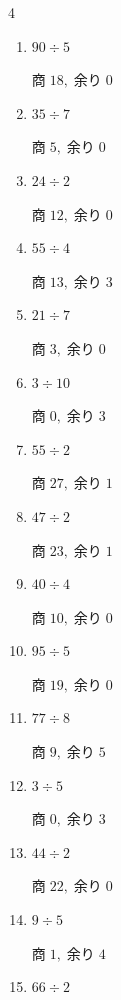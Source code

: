 \begin{multicols}{4}
\begin{enumerate}
        $商\; 19,\; 余り\; 1$

  \item $90 \div 5$

        $商\; 18,\; 余り\; 0$

  \item $35 \div 7$

        $商\; 5,\; 余り\; 0$

  \item $24 \div 2$

        $商\; 12,\; 余り\; 0$

  \item $55 \div 4$

        $商\; 13,\; 余り\; 3$

  \item $21 \div 7$

        $商\; 3,\; 余り\; 0$

  \item $3 \div 10$

        $商\; 0,\; 余り\; 3$

\columnbreak %

  \item $55 \div 2$

        $商\; 27,\; 余り\; 1$

  \item $47 \div 2$

        $商\; 23,\; 余り\; 1$

  \item $40 \div 4$

        $商\; 10,\; 余り\; 0$

  \item $95 \div 5$

        $商\; 19,\; 余り\; 0$

  \item $77 \div 8$

        $商\; 9,\; 余り\; 5$

  \item $3 \div 5$

        $商\; 0,\; 余り\; 3$

  \item $44 \div 2$

        $商\; 22,\; 余り\; 0$

  \item $9 \div 5$

        $商\; 1,\; 余り\; 4$

  \item $66 \div 2$


\end{enumerate}
\end{multicols}
